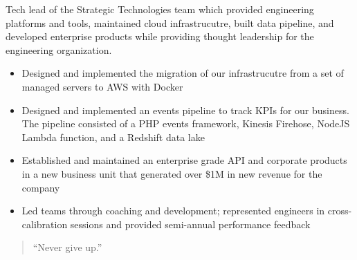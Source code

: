 \documentclass[10pt,a4paper,ragged2e,withhyper]{altacv}
\begin{document}
\begin{paracol}{2}
Tech lead of the Strategic Technologies team which provided engineering platforms and tools, maintained cloud infrastrucutre, built data pipeline, and developed enterprise products while providing thought leadership for the engineering organization.
\begin{itemize}
\item Designed and implemented the migration of our infrastrucutre from a set of managed servers to AWS with Docker
\item Designed and implemented an events pipeline to track KPIs for our business. The pipeline consisted of a PHP events framework, Kinesis Firehose, NodeJS Lambda function, and a Redshift data lake
\item Established and maintained an enterprise grade API and corporate products in a new business unit that generated over \$1M in new revenue for the company
\item Led teams through coaching and development; represented engineers in cross-calibration sessions and provided semi-annual performance feedback
\end{itemize}


\divider{}



\divider{}


\switchcolumn

\begin{quote}
``Never give up.''
\end{quote}






\end{paracol}
\end{document}
